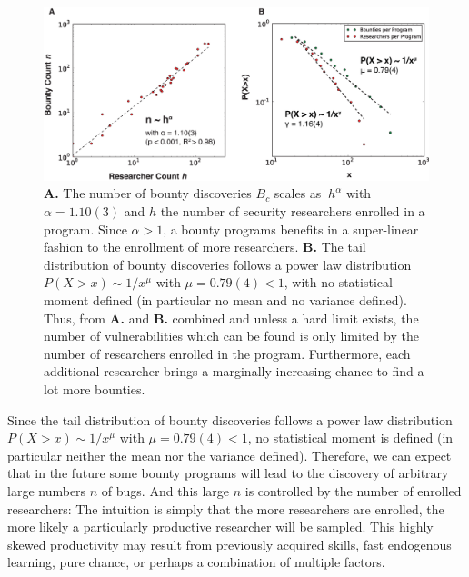 \begin{figure}[Ht]
\begin{center}
\includegraphics[width=12cm]{figures/scaling.eps}
\caption{ {\bf A.}  The number of bounty discoveries $B_c$ scales as $~h^{\alpha}$ with $\alpha = 1.10(3)$ and $h$ the number of security researchers enrolled in a program. Since $\alpha > 1$, a bounty programs benefits in a super-linear fashion to the enrollment of more researchers. {\bf B.} The tail distribution of bounty discoveries follows a power law distribution $P(X>x) \sim 1/x^\mu$  with $\mu = 0.79(4) < 1$, with no statistical moment defined (in particular no mean and no variance defined). Thus, from {\bf A.} and {\bf B.} combined and unless a hard limit exists, the number of vulnerabilities which can be found is only limited by the number of researchers enrolled in the program. Furthermore, each additional researcher brings a marginally increasing chance to find a lot more bounties.}
\label{fig:scaling}
\end{center}
\end{figure}

Since the tail distribution of bounty discoveries follows a power law distribution $P(X>x) \sim 1/x^\mu$  with $\mu = 0.79(4) < 1$, no statistical moment is defined (in particular neither the mean nor the variance defined). Therefore, we can expect that in the future some bounty programs will lead to the discovery of arbitrary large numbers $n$ of bugs. And this large $n$ is controlled by the number of enrolled researchers: The intuition is simply that the more researchers are enrolled, the more likely a particularly productive researcher will be sampled. This highly skewed productivity may result from previously acquired skills, fast endogenous learning, pure chance, or perhaps a combination of multiple factors.
 
